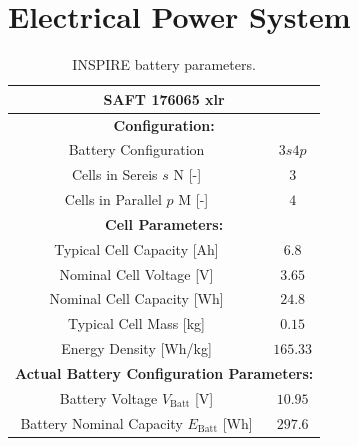 \section{Electrical Power System} \label{sec:AppendixEPS}
\begin{table}[htb]
\centering
\caption{INSPIRE battery parameters.}
\begin{tabular}{|c|c|}
\hline
\multicolumn{2}{|c|}{\textbf{SAFT 176065 xlr} \cite{SAFTBatteries.2018}}                                                                \\ \hline
\multicolumn{2}{|c|}{\textbf{Configuration:}}                                                                 \\ \hline
Battery Configuration                                                           & $3s4p$                        \\ \hline
Cells in Sereis $s$ N [-]                                                       & $3$                           \\ \hline
Cells in Parallel $p$ M [-]                                                     & $4$                           \\ \hline
\multicolumn{2}{|c|}{\textbf{Cell Parameters:}}                                                               \\ \hline
Typical Cell Capacity   [Ah]                                                    & $6.8$                         \\ \hline
Nominal Cell Voltage [V]                                                        & $3.65$                        \\ \hline
Nominal Cell Capacity [Wh]                                                      & $24.8$                        \\ \hline
Typical Cell Mass [kg]                                                          & $0.15$                        \\ \hline
Energy Density [Wh/kg]                                                     & $165.33$                      \\ \hline
\multicolumn{2}{|c|}{\textbf{Actual Battery Configuration Parameters:}}                                       \\ \hline
Battery Voltage $V_\text{Batt}$ [V]                                             & $10.95$                        \\ \hline
Battery Nominal Capacity $E_\text{Batt}$ [Wh]                                   & $297.6$                       \\ \hline

\end{tabular}
\end{table}
